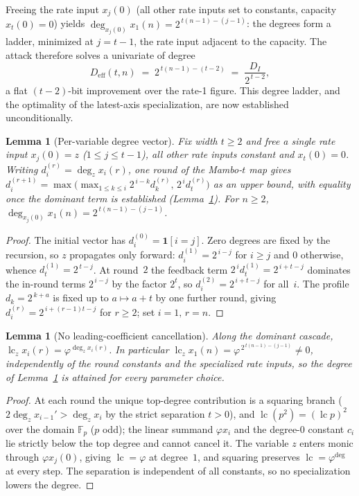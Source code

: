 \documentclass[11pt,a4paper]{article}
\newtheorem{lemma}[theorem]{Lemma}
\theoremstyle{definition}
\newcommand{\Fp}{\mathbb{F}_p}
\begin{document}
Freeing the rate input $x_j(0)$ (all other rate inputs set to
constants, capacity $x_t(0) = 0$) yields
$\deg_{x_j(0)} x_1(n) = 2^{\,t(n-1)-(j-1)}$: the degrees form a
ladder, minimized at $j = t - 1$, the rate input adjacent to the
capacity. The attack therefore solves a univariate of degree
\[
  D_{\mathrm{eff}}(t, n) \;=\; 2^{\,t(n-1)-(t-2)}
  \;=\; \frac{D_I}{2^{\,t-2}},
\]
a flat $(t-2)$-bit improvement over the rate-1 figure. This degree
ladder, and the optimality of the latest-axis specialization, are now
established unconditionally.

\begin{lemma}[Per-variable degree vector]\label{lem:deg_vector}
Fix width $t\ge 2$ and free a single rate input $x_j(0)=z$ ($1\le j\le
t-1$), all other rate inputs constant and $x_t(0)=0$. Writing
$d_i^{(r)}=\deg_z x_i(r)$, one round of the Mambo-$t$ map gives
$d_i^{(r+1)} = \max\!\bigl(\max_{1\le k\le i} 2^{\,i-k}d_k^{(r)},\,
2^{\,i}d_t^{(r)}\bigr)$ as an upper bound, with equality once the
dominant term is established (Lemma~\ref{lem:deg_floor}). For $n\ge 2$,
$\deg_{x_j(0)} x_1(n) = 2^{\,t(n-1)-(j-1)}$.
\end{lemma}

\begin{proof}
The initial vector has $d_i^{(0)}=\mathbf 1[i=j]$. Zero degrees are
fixed by the recursion, so $z$ propagates only forward:
$d_i^{(1)}=2^{\,i-j}$ for $i\ge j$ and $0$ otherwise, whence
$d_t^{(1)}=2^{\,t-j}$. At round~$2$ the feedback term
$2^{\,i}d_t^{(1)}=2^{\,i+t-j}$ dominates the in-round terms $2^{\,i-j}$
by the factor $2^{t}$, so $d_i^{(2)}=2^{\,i+t-j}$ for all~$i$. The
profile $d_k=2^{\,k+a}$ is fixed up to $a\mapsto a+t$ by one further
round, giving $d_i^{(r)}=2^{\,i+(r-1)t-j}$ for $r\ge 2$; set
$i=1,\,r=n$.
\end{proof}

\begin{lemma}[No leading-coefficient cancellation]\label{lem:deg_floor}
Along the dominant cascade, $\operatorname{lc}_z x_i(r)=\varphi^{\deg_z
x_i(r)}$. In particular $\operatorname{lc}_z x_1(n)=\varphi^{\,2^{\,
t(n-1)-(j-1)}}\ne 0$, independently of the round constants and the
specialized rate inputs, so the degree of Lemma~\ref{lem:deg_vector} is
attained for every parameter choice.
\end{lemma}

\begin{proof}
At each round the unique top-degree contribution is a squaring branch
($2\deg_z x_{i-1}'>\deg_z x_i$ by the strict separation $t>0$), and
$\operatorname{lc}(p^2)=(\operatorname{lc}p)^2$ over the domain $\Fp$
($p$ odd); the linear summand $\varphi x_i$ and the degree-$0$ constant
$c_i$ lie strictly below the top degree and cannot cancel it. The
variable $z$ enters monic through $\varphi x_j(0)$, giving
$\operatorname{lc}=\varphi$ at degree~$1$, and squaring preserves
$\operatorname{lc}=\varphi^{\deg}$ at every step. The separation is
independent of all constants, so no specialization lowers the degree.
\end{proof}
\end{document}
